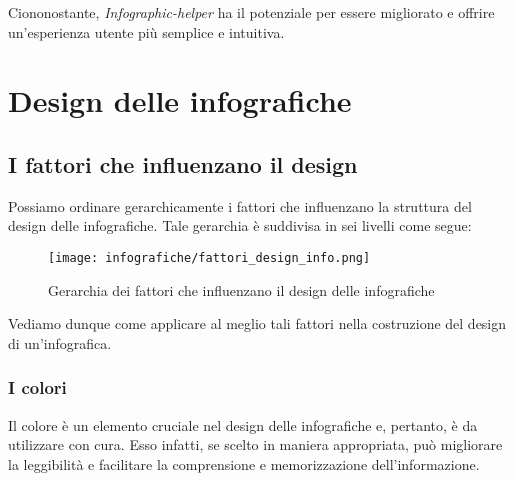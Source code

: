 Ciononostante, \emph{Infographic-helper} ha il potenziale per essere migliorato e offrire un'esperienza utente più semplice e intuitiva.



\section{Design delle infografiche}
\subsection{I fattori che influenzano il design}
Possiamo ordinare gerarchicamente i fattori che influenzano la struttura del design delle infografiche. Tale gerarchia è suddivisa in sei livelli come segue:
\begin{figure}[H] 
    \centering 
    \texttt{[image: infografiche/fattori\_design\_info.png]} 
    \caption{Gerarchia dei fattori che influenzano il design delle infografiche}
    \label{fig:fattori_design_info}
\end{figure}
\noindent Vediamo dunque come applicare al meglio tali fattori nella costruzione del design di un'infografica.

\subsubsection{I colori}
Il colore è un elemento cruciale nel design delle infografiche e, pertanto, è da utilizzare con cura. 
Esso infatti, se scelto in maniera appropriata, può migliorare la leggibilità e facilitare la comprensione e memorizzazione dell'informazione.

